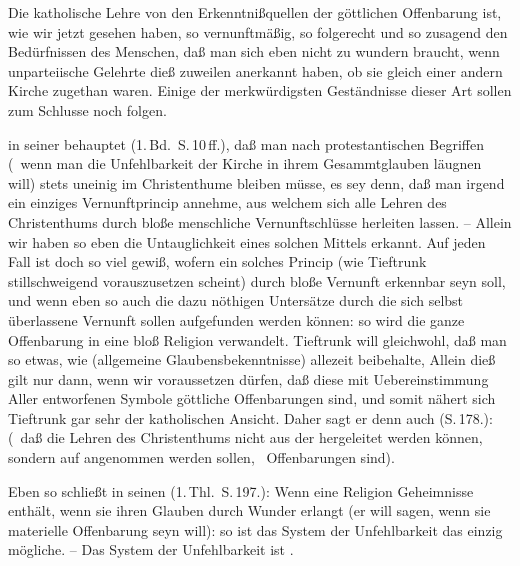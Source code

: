 Die katholische Lehre von den Erkenntnißquellen der göttlichen Offenbarung ist, wie wir jetzt gesehen haben, so vernunftmäßig, so folgerecht und so zusagend den Bedürfnissen des Menschen, daß man sich eben nicht zu wundern braucht, wenn unparteiische Gelehrte dieß zuweilen anerkannt haben, ob sie gleich einer andern Kirche zugethan waren. Einige der merkwürdigsten Geständnisse dieser Art sollen zum Schlusse noch folgen.~
\begin{aufza}
\item {} in seiner  behauptet (1.\,Bd.\ S.\,10\,ff.), daß man nach protestantischen Begriffen (\dh\ wenn man die Unfehlbarkeit der Kirche in ihrem Gesammtglauben läugnen will) stets uneinig im Christenthume bleiben müsse, es sey denn, daß man irgend ein einziges Vernunftprincip annehme, aus welchem sich alle Lehren des Christenthums durch bloße menschliche Vernunftschlüsse herleiten lassen. -- Allein wir haben so eben die Untauglichkeit eines solchen Mittels erkannt. Auf jeden Fall ist doch so viel gewiß, wofern ein solches Princip (wie Tieftrunk stillschweigend vorauszusetzen scheint) durch bloße Vernunft erkennbar seyn soll, und wenn eben so auch die dazu nöthigen Untersätze durch die sich selbst überlassene Vernunft sollen aufgefunden werden können: so wird die ganze Offenbarung in eine bloß  Religion verwandelt. Tieftrunk will gleichwohl, daß man so etwas, wie  (allgemeine Glaubensbekenntnisse) allezeit beibehalte,  Allein dieß gilt nur dann, wenn wir voraussetzen dürfen, daß diese mit Uebereinstimmung Aller entworfenen Symbole göttliche Offenbarungen sind, und somit nähert sich Tieftrunk gar sehr der katholischen Ansicht. Daher sagt er denn auch (S.\,178.):  (\dh\ daß die Lehren des Christenthums nicht aus der  hergeleitet werden können, sondern auf  angenommen werden sollen, \dh\ Offenbarungen sind).
\item Eben so schließt  in seinen  (1.\,Thl.\ S.\,197.): Wenn eine Religion Geheimnisse enthält, wenn sie ihren Glauben durch Wunder erlangt (er will sagen, wenn sie materielle Offenbarung seyn will): so ist das System der Unfehlbarkeit das einzig mögliche. -- Das System der Unfehlbarkeit ist .

\end{aufza}
